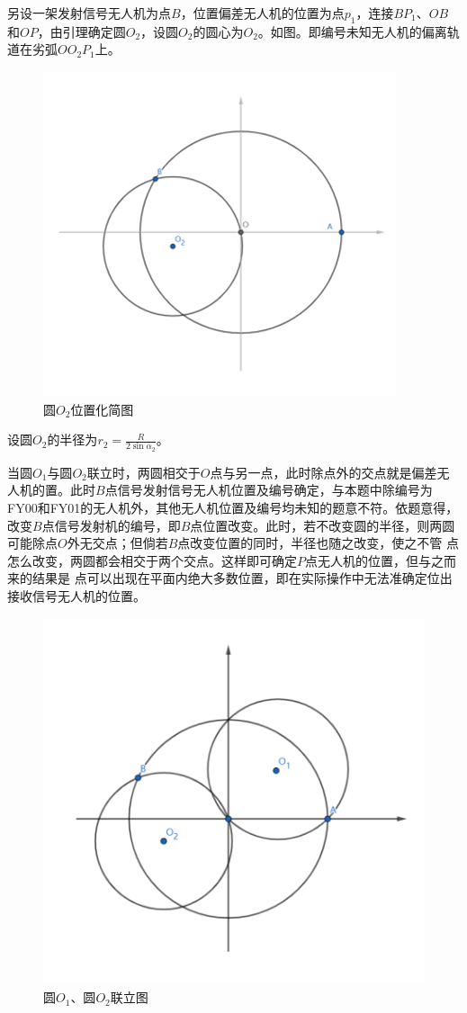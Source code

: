 另设一架发射信号无人机为点$B$，位置偏差无人机的位置为点$p_1$，连接$BP_1$、$OB$和$OP$，由引理确定圆$O_2$，设圆$O_2$的圆心为$O_2$。如图。即编号未知无人机的偏离轨道在劣弧$OO_2P_1$上。

\begin{figure}[h]
    \centering
    \includegraphics{res/figure04111100.png}
    \caption{圆$O_2$位置化简图}
\end{figure}

设圆$O_2$的半径为$r_2=\frac{R}{2\sin\alpha_2}$。

当圆$O_1$与圆$O_2$联立时，两圆相交于$O$点与另一点，此时除点外的交点就是偏差无人机的置。此时$B$点信号发射信号无人机位置及编号确定，与本题中除编号为FY00和FY01的无人机外，其他无人机位置及编号均未知的题意不符。依题意得，改变$B$点信号发射机的编号，即$B$点位置改变。此时，若不改变圆的半径，则两圆可能除点$O$外无交点；但倘若$B$点改变位置的同时，半径也随之改变，使之不管 点怎么改变，两圆都会相交于两个交点。这样即可确定$P$点无人机的位置，但与之而来的结果是 点可以出现在平面内绝大多数位置，即在实际操作中无法准确定位出接收信号无人机的位置。

\begin{figure}[h]
    \centering
    \includegraphics{res/figure111106.png}
    \caption{圆$O_1$、圆$O_2$联立图}
\end{figure}

